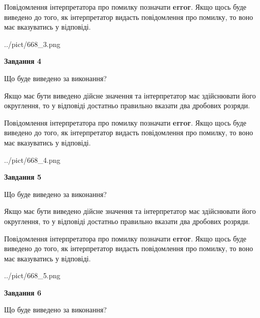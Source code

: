 \documentclass[12pt, ukrainian]{article}
\begin{document}
{\begin {Large}
Повідомлення інтерпретатора про помилку позначати \textbf{error}.
Якщо щось буде виведено до того, як інтерпретатор видасть повідомлення про помилку, 
то воно має вказуватись у відповіді. \par

\begin{center}
	{../pict/668_3.png}
\end{center}
\newpage

{\begin {center}\textbf{Завдання 4}\end {center}}\par
Що буде виведено за виконання? \par

Якщо має бути виведено дійсне значення та інтерпретатор має здійснювати його округлення, 
то у відповіді достатньо правильно вказати два дробових розряди.

Повідомлення інтерпретатора про помилку позначати \textbf{error}.
Якщо щось буде виведено до того, як інтерпретатор видасть повідомлення про помилку, 
то воно має вказуватись у відповіді. \par

\begin{center}
	{../pict/668_4.png}
\end{center}
\newpage

{\begin {center}\textbf{Завдання 5}\end {center}}\par
Що буде виведено за виконання? \par

Якщо має бути виведено дійсне значення та інтерпретатор має здійснювати його округлення, 
то у відповіді достатньо правильно вказати два дробових розряди.

Повідомлення інтерпретатора про помилку позначати \textbf{error}.
Якщо щось буде виведено до того, як інтерпретатор видасть повідомлення про помилку, 
то воно має вказуватись у відповіді. \par

\begin{center}
	{../pict/668_5.png}
\end{center}
\newpage

{\begin {center}\textbf{Завдання 6}\end {center}}\par
Що буде виведено за виконання? \par


\end{Large}}
\end{document}
